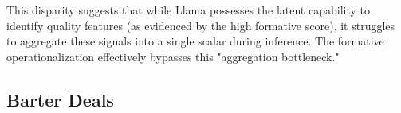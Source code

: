 This disparity suggests that while Llama possesses the latent capability to identify quality features (as evidenced by the high formative score), it struggles to aggregate these signals into a single scalar during inference. The formative operationalization effectively bypasses this "aggregation bottleneck."

\subsection{Barter Deals}
